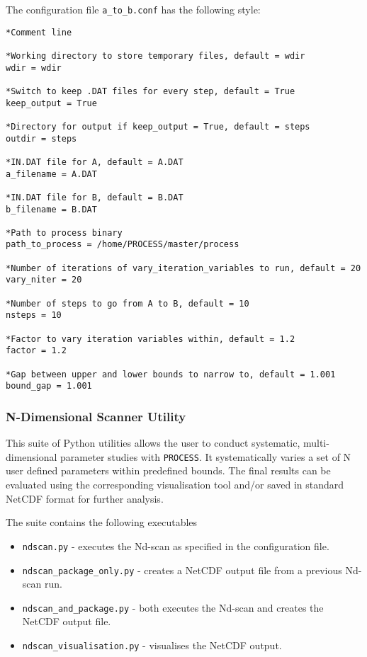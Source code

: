 \documentclass[11pt,a4paper]{article}
\newcommand{\process}{\mbox{\texttt{PROCESS}}}
\begin{document}
The configuration file \texttt{a\_to\_b.conf} has the following style:
\begin{framed}
\begin{verbatim}
*Comment line

*Working directory to store temporary files, default = wdir
wdir = wdir

*Switch to keep .DAT files for every step, default = True
keep_output = True

*Directory for output if keep_output = True, default = steps
outdir = steps

*IN.DAT file for A, default = A.DAT
a_filename = A.DAT

*IN.DAT file for B, default = B.DAT
b_filename = B.DAT

*Path to process binary
path_to_process = /home/PROCESS/master/process

*Number of iterations of vary_iteration_variables to run, default = 20
vary_niter = 20

*Number of steps to go from A to B, default = 10
nsteps = 10

*Factor to vary iteration variables within, default = 1.2
factor = 1.2

*Gap between upper and lower bounds to narrow to, default = 1.001
bound_gap = 1.001
\end{verbatim}
\end{framed}



\subsubsection{N-Dimensional Scanner Utility}

This suite of Python utilities allows the user to conduct systematic, multi-dimensional parameter studies with \process. It systematically varies a set of N user defined parameters within predefined bounds. The final results can be evaluated using the corresponding visualisation tool and/or saved in standard NetCDF format for further analysis.

The suite contains the following executables
\begin{itemize}
\item \texttt{ndscan.py} - executes the Nd-scan as specified in the configuration file.
\item \texttt{ndscan\_package\_only.py} - creates a NetCDF output file from a previous Nd-scan run.
\item \texttt{ndscan\_and\_package.py} - both executes the Nd-scan and creates the NetCDF output file.
\item \texttt{ndscan\_visualisation.py} - visualises the NetCDF output.
\end{itemize}
\end{document}
